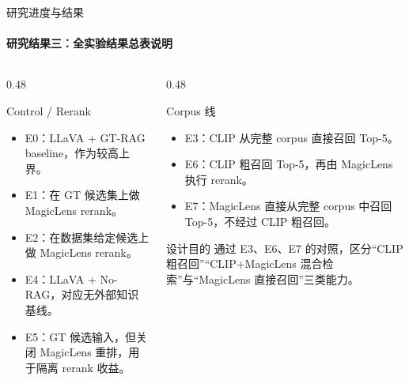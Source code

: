 \documentclass[10pt,aspectratio=169,]{beamer}
\begin{document}
\begin{frame}{研究进度与结果}
	\framesubtitle{研究结果三：全实验结果总表说明}
	\begin{columns}[T]
		\begin{column}{0.48\textwidth}
			\begin{block}{Control / Rerank}
				\begin{itemize}
					\item E0：LLaVA + GT-RAG baseline，作为较高上界。
					\item E1：在 GT 候选集上做 MagicLens rerank。
					\item E2：在数据集给定候选上做 MagicLens rerank。
					\item E4：LLaVA + No-RAG，对应无外部知识基线。
					\item E5：GT 候选输入，但关闭 MagicLens 重排，用于隔离 rerank 收益。
				\end{itemize}
			\end{block}
		\end{column}
		\begin{column}{0.48\textwidth}
			\begin{alertblock}{Corpus 线}
				\begin{itemize}
					\item E3：CLIP 从完整 corpus 直接召回 Top-5。
					\item E6：CLIP 粗召回 Top-5，再由 MagicLens 执行 rerank。
					\item E7：MagicLens 直接从完整 corpus 中召回 Top-5，不经过 CLIP 粗召回。
				\end{itemize}
			\end{alertblock}
			\begin{block}{设计目的}
				通过 E3、E6、E7 的对照，区分“CLIP 粗召回”“CLIP+MagicLens 混合检索”与“MagicLens 直接召回”三类能力。
			\end{block}
		\end{column}
	\end{columns}
\end{frame}
\end{document}
